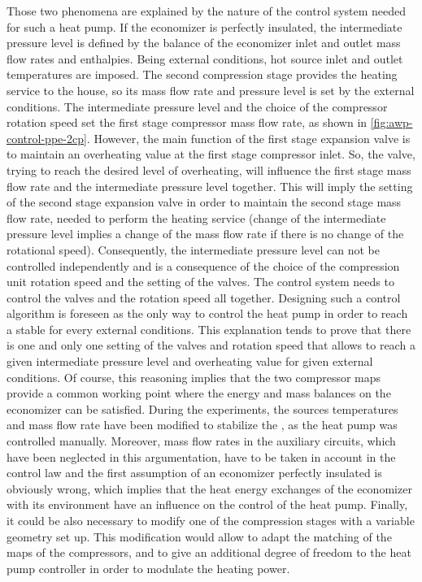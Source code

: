 Those two phenomena are explained by the nature of the control system
needed for such a heat pump. If the economizer is perfectly insulated,
the intermediate pressure level is defined by the balance of the
economizer inlet and outlet mass flow rates and enthalpies. Being
external conditions, hot source inlet and outlet temperatures are
imposed. The second compression stage provides the heating service to
the house, so its mass flow rate and pressure level is set by the
external conditions. The intermediate pressure level and the choice of
the compressor rotation speed set the first stage compressor mass flow
rate, as shown in \cref{fig:awp-control-ppe-2cp}. However, the main
function of the first stage expansion valve is to maintain an
overheating value at the first stage compressor inlet. So, the valve,
trying to reach the desired level of overheating, will influence the
first stage mass flow rate and the intermediate pressure level
together.  This will imply the setting of the second stage expansion
valve in order to maintain the second stage mass flow rate, needed to
perform the heating service (change of the intermediate pressure level
implies a change of the mass flow rate if there is no change of the
rotational speed). Consequently, the intermediate pressure level can
not be controlled independently and is a consequence of the choice of
the compression unit rotation speed and the setting of the valves. The
control system needs to control the valves and the rotation speed all
together. Designing such a control algorithm is foreseen as the only
way to control the heat pump in order to reach a stable \OP{} for
every external conditions. This explanation tends to prove that there
is one and only one setting of the valves and rotation speed that
allows to reach a given intermediate pressure level and overheating
value for given external conditions. Of course, this reasoning implies
that the two compressor maps provide a common working point where the
energy and mass balances on the economizer can be satisfied. During
the experiments, the sources temperatures and mass flow rate have been
modified to stabilize the \OP{}, as the heat pump was controlled
manually. Moreover, mass flow rates in the auxiliary circuits, which
have been neglected in this argumentation, have to be taken in account
in the control law and the first assumption of an economizer perfectly
insulated is obviously wrong, which implies that the heat energy
exchanges of the economizer with its environment have an influence on
the control of the heat pump. Finally, it could be also necessary to
modify one of the compression stages with a variable geometry set
up. This modification would allow to adapt the matching of the maps of
the compressors, and to give an additional degree of freedom to the
heat pump controller in order to modulate the heating power.

